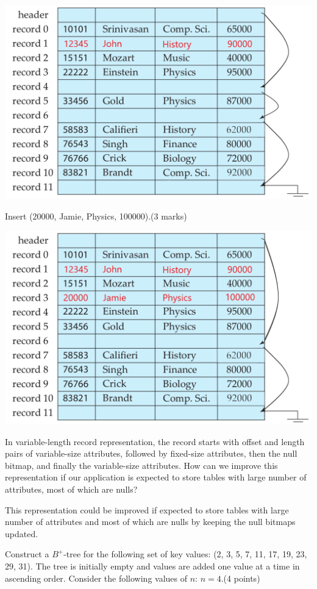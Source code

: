 \documentclass[a4 paper]{article}
\begin{document}
{\centering \includegraphics[width=\textwidth/2]{figure2 - Copy - Copy.png}}

 Insert (20000, Jamie, Physics, 100000).\indent (3 marks)

{\centering \includegraphics[width=\textwidth/2]{figure2 - Copy - Copy - Copy.png}}

In variable-length record representation, the record starts with offset and length pairs of variable-size attributes, followed by fixed-size attributes, then the null bitmap, and finally the variable-size attributes. How can we improve this representation if our application is expected to store tables with large number of attributes, most of which are nulls?

This representation could be improved if expected to store tables with large number of attributes and most of which are nulls by
keeping the null bitmaps updated.

Construct a $B^{+}$-tree for the following set of key values: (2, 3, 5, 7, 11, 17, 19, 23, 29, 31). The tree is initially empty and values are added one value at a time in ascending order. Consider the following values of $n$:
 $n = 4$.\indent \indent (4 points)
\end{document}
